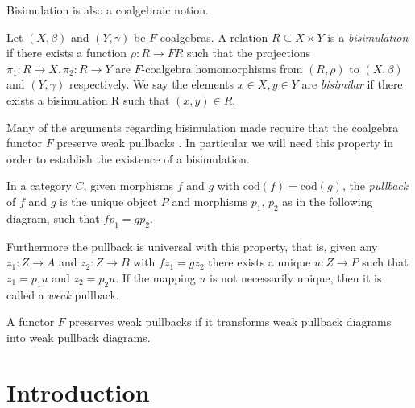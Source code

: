 \documentclass[a4paper,UKenglish,cleveref, autoref, thm-restate]{lipics-v2021}
\theoremstyle{plain}\newtheoremrep{thm}{Theorem}[section]
\begin{document}
\begin{toappendix}
			Bisimulation is also a coalgebraic notion.
			\begin{defn}
				Let $(X, \beta)$ and $(Y, \gamma)$ be $F$-coalgebras. A relation $R\subseteq X \times Y$ is a \emph{bisimulation} if there exists a function $\rho: R \to FR$ such that the projections $\pi_1: R\to X, \pi_2: R\to Y$ are $F$-coalgebra homomorphisms from $(R, \rho)$ to $(X, \beta)$ and $(Y, \gamma)$ respectively. We say the elements $x\in X, y\in Y$ are \emph{bisimilar} if there exists a bisimulation R such that $(x,y) \in R$. \label{bisimulation}
			\end{defn}
			
			Many of the arguments regarding bisimulation made require that the coalgebra functor $F$ preserve weak pullbacks \cite{Rutten2000UniversalCA}. In particular we will need this property in order to establish the existence of a bisimulation.
			\begin{defn}
				In a category $C$, given morphisms $f$ and $g$ with $\text{cod}(f) =  \text{cod}(g)$, the \emph{pullback} of $f$ and $g$ is the unique object $P$ and morphisms $p_1$, $p_2$ as in the following diagram, such that $fp_1 = gp_2$. 
				\begin{center}\end{center}
				
				Furthermore the pullback is universal with this property, that is, given any $z_1: Z \to A$ and $z_2: Z \to B$ with $fz_1=gz_2$ there exists a unique $u:Z\to P$ such that $z_1 = p_1u$ and $z_2 = p_2u$. If the mapping $u$ is not necessarily unique, then it is called a \emph{weak} pullback.
			\end{defn}
			
			\begin{defn}
			A functor $F$ preserves weak pullbacks if it transforms weak pullback diagrams into weak pullback diagrams.
			\end{defn}
		\end{toappendix}
		\section{Introduction}\label{intoductionS}
		
\end{document}
